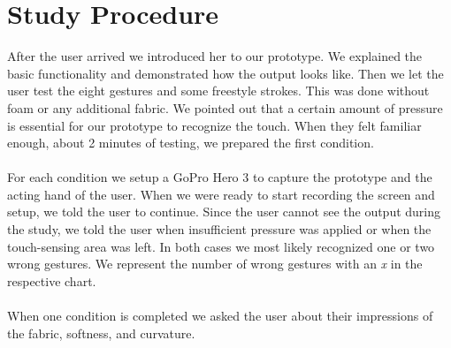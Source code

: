 \section{Study Procedure}
After the user arrived we introduced her to our prototype. We explained the basic functionality and demonstrated how the output looks like. Then we let the user test the eight gestures and some freestyle strokes. This was done without foam or any additional fabric. We pointed out that a certain amount of pressure is essential for our prototype to recognize the touch. When they felt familiar enough, about 2 minutes of testing, we prepared the first condition. 
\\ \\
For each condition we setup a GoPro Hero 3 to capture the prototype and the acting hand of the user. When we were ready to start recording the screen and setup, we told the user to continue. Since the user cannot see the output during the study, we told the user when insufficient  pressure was applied or when the touch-sensing area was left. In both cases we most likely recognized one or two wrong gestures. We represent the number of wrong gestures with an \emph{x} in the respective chart. 
\\ \\
When one condition is completed we asked the user about their impressions of the fabric, softness, and curvature. 

